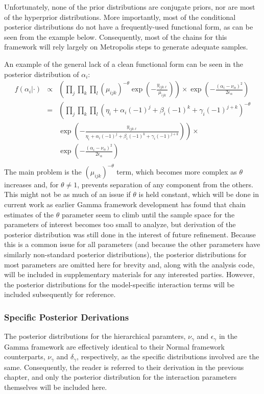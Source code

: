 Unfortunately, none of the prior distributions are conjugate priors,
nor are most of the hyperprior distributions.  More importantly, most
of the conditional posterior distributions do not have a
frequently-used functional form, as can be seen from the example
below.  Consequently, most of the chains for this framework will rely
largely on Metropolis steps to generate adequate samples.

An example of the general lack of a clean functional form can be seen
in the posterior distribution of $\alpha_i$:
\begin{eqnarray*}
\displaystyle{f(\alpha_i|\cdot)}&\propto&\displaystyle{\left(\prod_j\prod_k\prod_l(\mu_{ijk})^{-\theta}\exp\left(-\frac{y_{ijk\ell}}{\mu_{ijk}}\right)\right)\times\exp\left(-\frac{(\alpha_i-\nu_\alpha)^2}{2\epsilon_\alpha}\right)}\\
&=&\displaystyle{\left(\prod_j\prod_k\prod_l(\eta_i + \alpha_i\left(-1\right)^j + \beta_i \left(-1\right)^k + \gamma_i \left(-1\right)^{j+k})^{-\theta}\right.}\\
&&\displaystyle{\left.\exp\left(-\frac{y_{ijk\ell}}{\eta_i + \alpha_i\left(-1\right)^j + \beta_i \left(-1\right)^k + \gamma_i \left(-1\right)^{j+k}}\right)\right)\times}\\
&&\displaystyle{\exp\left(-\frac{(\alpha_i-\nu_\alpha)^2}{2\epsilon_\alpha}\right)}\\
\end{eqnarray*}
The main problem is the $(\mu_{ijk})^{-\theta}$ term, which becomes
more complex as $\theta$ increases and, for $\theta \neq 1$, prevents
separation of any component from the others.  This might not be as
much of an issue if $\theta$ is held constant, which will be done in
current work as earlier Gamma framework development has found that
chain estimates of the $\theta$ parameter seem to climb until the
sample space for the parameters of interest becomes too small to
analyze, but derivation of the posterior distribution was still done
in the interest of future refinement.  Because this is a common issue
for all parameters (and because the other parameters have similarly
non-standard posterior distributions), the posterior distributions for
most parameters are omitted here for brevity and, along with the
analysis code, will be included in supplementary materials for any
interested parties.  However, the posterior distributions for the
model-specific interaction terms will be included subsequently for
reference.

\subsubsection{Specific Posterior Derivations}
The posterior distributions for the hierarchical paramters,
$\nu_\gamma$ and $\epsilon_\gamma$ in the Gamma framework are
effectively identical to their Normal framework counterparts,
$\nu_\gamma$ and $\delta_\gamma$, respectively, as the specific
distributions involved are the same.  Consequently, the reader is
referred to their derivation in the previous chapter, and only the
posterior distribution for the interaction parameters themselves will
be included here.\\

